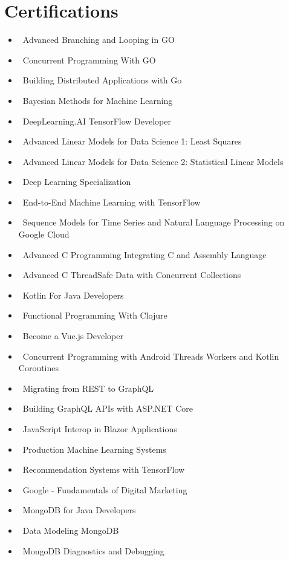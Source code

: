 \documentclass[letterpaper,10pt]{article}
\newcommand{\resumeItem}[1]{\item\small{#1}}
\newcommand{\resumeSubHeadingList}{\begin{itemize}[leftmargin=0.15in, label={}]}
\newcommand{\resumeSubHeadingListEnd}{\end{itemize}}
\begin{document}
\section{Certifications}
\resumeSubHeadingList
    \resumeItem{\textbullet\ Advanced Branching and Looping in GO}
 \resumeItem{\textbullet\ Concurrent Programming With GO}
 \resumeItem{\textbullet\ Building Distributed Applications with Go}
 \resumeItem{\textbullet\ Bayesian Methods for Machine Learning}
 \resumeItem{\textbullet\ DeepLearning.AI TensorFlow Developer}
 \resumeItem{\textbullet\ Advanced Linear Models for Data Science 1: Least Squares}
 \resumeItem{\textbullet\ Advanced Linear Models for Data Science 2: Statistical Linear Models}
 \resumeItem{\textbullet\ Deep Learning Specialization}
 \resumeItem{\textbullet\ End-to-End Machine Learning with TensorFlow}
 \resumeItem{\textbullet\ Sequence Models for Time Series and Natural Language Processing on Google Cloud}
 \resumeItem{\textbullet\ Advanced C Programming Integrating C and Assembly Language}
 \resumeItem{\textbullet\ Advanced C ThreadSafe Data with Concurrent Collections}
 \resumeItem{\textbullet\ Kotlin For Java Developers}
 \resumeItem{\textbullet\ Functional Programming With Clojure}
 \resumeItem{\textbullet\ Become a Vue.js Developer}
 \resumeItem{\textbullet\ Concurrent Programming with Android Threads Workers and Kotlin Coroutines}
 \resumeItem{\textbullet\ Migrating from REST to GraphQL}
 \resumeItem{\textbullet\ Building GraphQL APIs with ASP.NET Core}
 \resumeItem{\textbullet\ JavaScript Interop in Blazor Applications}
 \resumeItem{\textbullet\ Production Machine Learning Systems}
 \resumeItem{\textbullet\ Recommendation Systems with TensorFlow}
 \resumeItem{\textbullet\ Google - Fundamentals of Digital Marketing}
 \resumeItem{\textbullet\ MongoDB for Java Developers}
 \resumeItem{\textbullet\ Data Modeling MongoDB}
 \resumeItem{\textbullet\ MongoDB Diagnostics and Debugging}
\resumeSubHeadingListEnd
\end{document}

